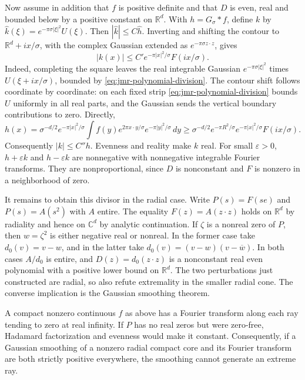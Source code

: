 \documentclass[11pt,a4paper]{article}
\numberwithin{equation}{section}
\begin{document}
Now assume in addition that $f$ is positive definite and that $D$ is even, real and bounded below by a positive constant
on $\mathbb R^d$. With $h=G_\sigma*f$, define $k$ by
$\widehat k(\xi)=e^{-\pi\sigma|\xi|^2}U(\xi)$. Then
$|\widehat k|\le C\widehat h$. Inverting and shifting the contour to
$\mathbb R^d+i x/\sigma$, with the complex Gaussian extended as
$e^{-\pi\sigma z\cdot z}$, gives
\[
 |k(x)|\le C' e^{-\pi|x|^2/\sigma} F(ix/\sigma).
\]
Indeed, completing the square leaves the real integrable Gaussian
$e^{-\pi\sigma|\xi|^2}$ times $U(\xi+ix/\sigma)$, bounded by
\eqref{eq:jmr-polynomial-division}. The contour shift follows
coordinate by coordinate: on each fixed strip \eqref{eq:jmr-polynomial-division}
bounds $U$ uniformly in all real parts, and the Gaussian sends the
vertical boundary contributions to zero. Directly,
\[
 h(x)=\sigma^{-d/2}e^{-\pi|x|^2/\sigma}
   \int f(y)e^{2\pi x\cdot y/\sigma}e^{-\pi|y|^2/\sigma}\,dy
 \ge \sigma^{-d/2} e^{-\pi R^2/\sigma}
       e^{-\pi|x|^2/\sigma}F(ix/\sigma).
\]
Consequently $|k|\le C''h$. Evenness and reality make $k$ real.
For small $\varepsilon>0$, $h+\varepsilon k$ and $h-\varepsilon k$
are nonnegative with nonnegative integrable Fourier transforms. They
are nonproportional, since $D$ is nonconstant and $F$ is nonzero
in a neighborhood of zero.

It remains to obtain this divisor in the radial case. Write
$P(s)=F(se)$ and $P(s)=A(s^2)$ with $A$ entire.
The equality $F(z)=A(z\cdot z)$ holds on $\mathbb R^d$ by radiality
and hence on $\mathbb C^d$ by analytic continuation. If $\zeta$
is a nonreal zero of $P$, then $w=\zeta^2$ is either negative real
or nonreal. In the former case take $d_0(v)=v-w$, and in the latter
take $d_0(v)=(v-w)(v-\overline w)$. In both cases $A/d_0$ is entire,
and $D(z)=d_0(z\cdot z)$ is a nonconstant real even polynomial with
a positive lower bound on $\mathbb R^d$. The two perturbations just
constructed are radial, so also refute extremality in the smaller
radial cone. The converse implication is the Gaussian smoothing theorem.

A compact nonzero continuous $f$ as above has a Fourier transform
along each ray tending to zero at real infinity. If $P$ has no real
zeros but were zero-free, Hadamard factorization and evenness would make
it constant. Consequently, if a Gaussian smoothing of a nonzero radial compact core and its Fourier transform are both strictly positive everywhere, the smoothing cannot generate an extreme ray.
\end{document}
